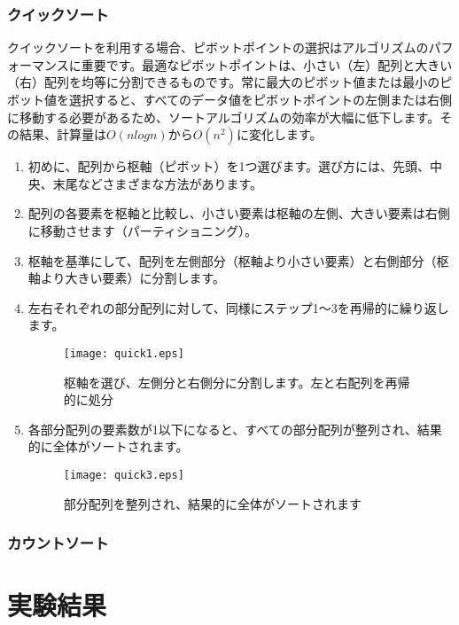 \documentclass[a4j, 12pt]{jarticle}
\begin{document}
\subsubsection{クイックソート}
クイックソートを利用する場合、ピボットポイントの選択はアルゴリズムのパフォーマンスに重要です。最適なピボットポイントは、小さい（左）配列と大きい（右）配列を均等に分割できるものです。常に最大のピボット値または最小のピボット値を選択すると、すべてのデータ値をピボットポイントの左側または右側に移動する必要があるため、ソートアルゴリズムの効率が大幅に低下します。その結果、計算量は$O(nlogn)$から$O(n^2)$に変化します\cite{gfg:quicksort2025}。\\
\begin{enumerate}
  \item 初めに、配列から枢軸（ピボット）を1つ選びます。選び方には、先頭、中央、末尾などさまざまな方法があります。
  \item 配列の各要素を枢軸と比較し、小さい要素は枢軸の左側、大きい要素は右側に移動させます（パーティショニング）。
  \item 枢軸を基準にして、配列を左側部分（枢軸より小さい要素）と右側部分（枢軸より大きい要素）に分割します。
  \item 左右それぞれの部分配列に対して、同様にステップ1～3を再帰的に繰り返します。
  \begin{figure}[H]
    \centering
    \texttt{[image: quick1.eps]}
    \caption{枢軸を選び、左側分と右側分に分割します。左と右配列を再帰的に処分}
  \end{figure}
  \item 各部分配列の要素数が1以下になると、すべての部分配列が整列され、結果的に全体がソートされます。
  \begin{figure}[H]
    \centering
    \texttt{[image: quick3.eps]}
    \caption{部分配列を整列され、結果的に全体がソートされます}
  \end{figure}
\end{enumerate}
\subsubsection{カウントソート}
\newpage
\section{実験結果}
\end{document}
